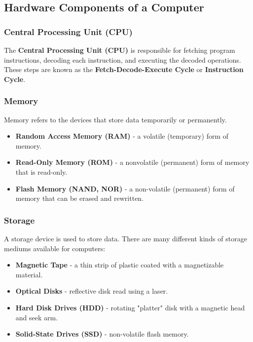 \documentclass[pdftex,10pt]{article}
\begin{document}
\subsection{Hardware Components of a Computer}


\subsubsection{Central Processing Unit (CPU)}

The \textbf{Central Processing Unit (CPU)} is responsible for fetching program instructions, decoding each instruction, and executing the decoded operations. These steps are known as the \textbf{Fetch-Decode-Execute Cycle} or \textbf{Instruction Cycle}.

\subsubsection{Memory}

Memory refers to the devices that store data temporarily or permanently.

\begin{itemize}
    \item \textbf{Random Access Memory (RAM)} - a volatile (temporary) form of memory.
    \item \textbf{Read-Only Memory (ROM)} - a nonvolatile (permanent) form of memory that is read-only.
    \item \textbf{Flash Memory (NAND, NOR)} - a non-volatile (permanent) form of memory that can be erased and rewritten.
\end{itemize}

\subsubsection{Storage}

A storage device is used to store data. There are many different kinds of storage mediums available for computers:

\begin{itemize}
    \item \textbf{Magnetic Tape} - a thin strip of plastic coated with a magnetizable material.
    \item \textbf{Optical Disks} - reflective disk read using a laser.
    \item \textbf{Hard Disk Drives (HDD)} - rotating "platter" disk with a magnetic head and seek arm.
    \item \textbf{Solid-State Drives (SSD)} - non-volatile flash memory.
\end{itemize}
\end{document}
